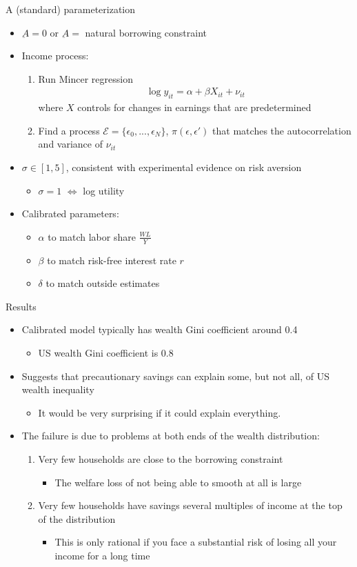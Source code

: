 \documentclass[9pt]{beamer}
\newcommand{\bit}{\begin{itemize}}
\newcommand{\eit}{\end{itemize}}
\newcommand{\ben}{\begin{enumerate}}
\newcommand{\een}{\end{enumerate}}
\begin{document}
\begin{frame}{A (standard) parameterization}

\bit
\setlength\itemsep{2em}

	\item $\underbar A=0$ or $\underbar A=$ natural borrowing constraint
	
	\item Income process: 
	\ben
	\item Run Mincer regression
	\begin{eqnarray}
	\log y_{it} = \alpha + \beta X_{it} + \nu_{it}  \nonumber
	\end{eqnarray}
	where $X$ controls for changes in earnings that are predetermined
	
	\item Find a process $\mathcal E = \{\epsilon_0, ..., \epsilon_N\}$, $\pi(\epsilon, \epsilon')$ that matches the autocorrelation and variance of $\nu_{it}$ 
	\een

\item $\sigma \in [1,5]$, consistent with experimental evidence on risk aversion
\bit
	\item $\sigma=1$ $\Leftrightarrow$ log utility
\eit

\item Calibrated parameters:
\bit
\item $\alpha$ to match labor share $\frac{WL}{Y}$
\item $\beta$ to match risk-free interest rate $r$
\item $\delta$ to match outside estimates
\eit

\eit

\end{frame}

\begin{frame}{Results}

\bit
\setlength\itemsep{2em}

\item Calibrated model typically has wealth Gini coefficient around 0.4
\bit
	\item US wealth Gini coefficient is 0.8
\eit

\item Suggests that precautionary savings can explain some, but not all, of US wealth inequality
\bit
	\item It would be very surprising if it could explain everything.
\eit

\item The failure is due to problems at both ends of the wealth distribution:
\ben
\setlength\itemsep{0.5em}
\item Very few households are close to the borrowing constraint
\bit
	\item The welfare loss of not being able to smooth at all is large
\eit
\item Very few households have savings several multiples of income at the top of the distribution
\bit
	\item This is only rational if you face a substantial risk of losing all your income for a long time
\eit
\een

\eit

\end{frame}
\end{document}
